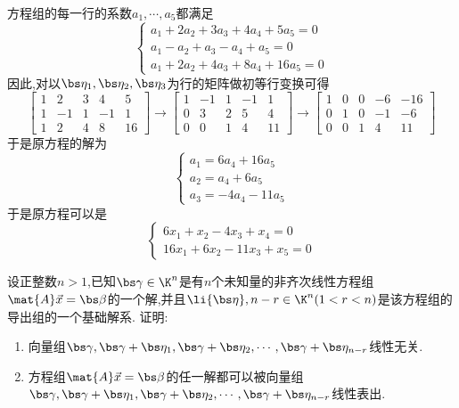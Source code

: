 \documentclass{ctexart}
\begin{document}
\begin{solution}
    方程组的每一行的系数$a_1,\cdots,a_5$都满足
    \[\left\{\begin{array}{l}
        a_1+2a_2+3a_3+4a_4+5a_5=0\\
        a_1-a_2+a_3-a_4+a_5=0\\
        a_1+2a_2+4a_3+8a_4+16a_5=0
    \end{array}\right.\]
    因此,对以$\bs\eta_1,\bs\eta_2,\bs\eta_3$为行的矩阵做初等行变换可得
    \[\begin{bmatrix}
        1&2&3&4&5\\
        1&-1&1&-1&1\\
        1&2&4&8&16
    \end{bmatrix}\longrightarrow\begin{bmatrix}
        1&-1&1&-1&1\\
        0&3&2&5&4\\
        0&0&1&4&11
    \end{bmatrix}\longrightarrow\begin{bmatrix}
        1&0&0&-6&-16\\
        0&1&0&-1&-6\\
        0&0&1&4&11
    \end{bmatrix}\]
    于是原方程的解为
    \[\left\{\begin{array}{l}
        a_1=6a_4+16a_5\\
        a_2=a_4+6a_5\\
        a_3=-4a_4-11a_5
    \end{array}\right.\]
    于是原方程可以是
    \[\left\{\begin{array}{l}
        6x_1+x_2-4x_3+x_4=0\\
        16x_1+6x_2-11x_3+x_5=0
    \end{array}\right.\]
\end{solution}
\begin{homework}[4(10')]
    设正整数$n>1$,已知$\bs\gamma\in\K^n$是有$n$个未知量的非齐次线性方程组$\mat{A}\vec{x}=\bs\beta$的一个解,并且$\li{\bs\eta},{n-r}\in\K^n(1<r<n)$是该方程组的导出组的一个基础解系.
    证明:
    \begin{enumerate}
        \item 向量组$\bs\gamma,\bs\gamma+\bs\eta_1,\bs\gamma+\bs\eta_2,\cdots,\bs\gamma+\bs\eta_{n-r}$线性无关.
        \item 方程组$\mat{A}\vec{x}=\bs\beta$的任一解都可以被向量组$\bs\gamma,\bs\gamma+\bs\eta_1,\bs\gamma+\bs\eta_2,\cdots,\bs\gamma+\bs\eta_{n-r}$线性表出.
    \end{enumerate}
\end{homework}
\end{document}
